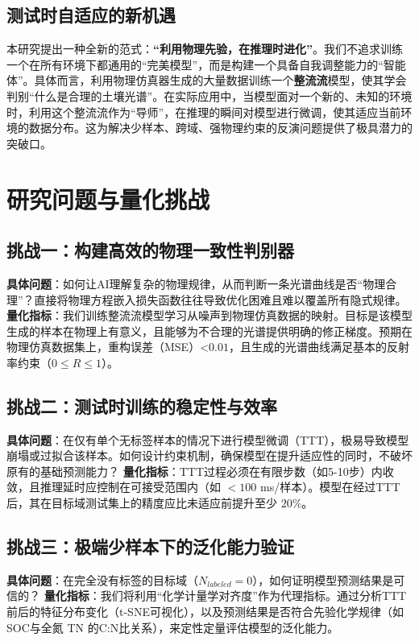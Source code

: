 \documentclass[12pt, a4paper]{article}
\begin{document}
\subsection{测试时自适应的新机遇}
本研究提出一种全新的范式：\textbf{“利用物理先验，在推理时进化”}。我们不追求训练一个在所有环境下都通用的“完美模型”，而是构建一个具备自我调整能力的“智能体”。具体而言，利用物理仿真器生成的大量数据训练一个\textbf{整流流}模型，使其学会判别“什么是合理的土壤光谱”。在实际应用中，当模型面对一个新的、未知的环境时，利用这个整流流作为“导师”，在推理的瞬间对模型进行微调，使其适应当前环境的数据分布。这为解决少样本、跨域、强物理约束的反演问题提供了极具潜力的突破口。

\section{研究问题与量化挑战}

\subsection{挑战一：构建高效的物理一致性判别器}
\textbf{具体问题}：如何让AI理解复杂的物理规律，从而判断一条光谱曲线是否“物理合理”？直接将物理方程嵌入损失函数往往导致优化困难且难以覆盖所有隐式规律。
\textbf{量化指标}：我们训练整流流模型学习从噪声到物理仿真数据的映射。目标是该模型生成的样本在物理上有意义，且能够为不合理的光谱提供明确的修正梯度。预期在物理仿真数据集上，重构误差（MSE）<$0.01$，且生成的光谱曲线满足基本的反射率约束（$0 \le R \le 1$）。

\subsection{挑战二：测试时训练的稳定性与效率}
\textbf{具体问题}：在仅有单个无标签样本的情况下进行模型微调（TTT），极易导致模型崩塌或过拟合该样本。如何设计约束机制，确保模型在提升适应性的同时，不破坏原有的基础预测能力？
\textbf{量化指标}：TTT过程必须在有限步数（如5-10步）内收敛，且推理延时应控制在可接受范围内（如 $<100$ ms/样本）。模型在经过TTT后，其在目标域测试集上的精度应比未适应前提升至少 $20\%$。

\subsection{挑战三：极端少样本下的泛化能力验证}
\textbf{具体问题}：在完全没有标签的目标域（$N_{labeled}=0$），如何证明模型预测结果是可信的？
\textbf{量化指标}：我们将利用“化学计量学对齐度”作为代理指标。通过分析TTT前后的特征分布变化（t-SNE可视化），以及预测结果是否符合先验化学规律（如SOC与全氮 TN 的C:N比关系），来定性定量评估模型的泛化能力。
\end{document}

